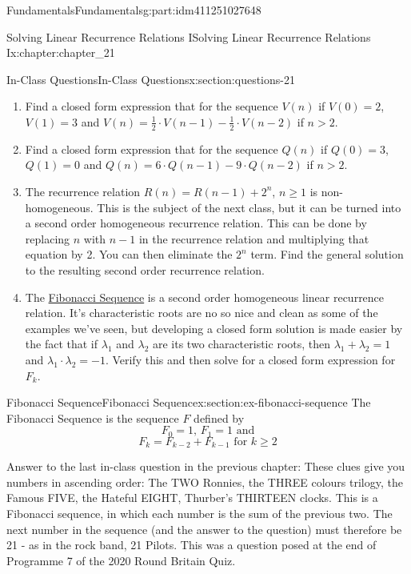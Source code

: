 \documentclass[oneside,10pt,]{book}
\numberwithin{equation}{section}
\newcommand{\gt}{>}
\begin{document}
\begin{partptx}{Fundamentals}{}{Fundamentals}{}{}{g:part:idm411251027648}
\begin{chapterptx}{Solving Linear Recurrence Relations I}{}{Solving Linear Recurrence Relations I}{}{}{x:chapter:chapter_21}
\begin{sectionptx}{In-Class Questions}{}{In-Class Questions}{}{}{x:section:questions-21}
\begin{enumerate}[label=\arabic*.]
\item{}Find a closed form expression that for the sequence \(V(n)\) if  \(V(0)=2\), \(V(1)= 3\) and \(V(n)= \frac{1}{2}\cdot V(n-1)- \frac{1}{2}\cdot V(n-2)\) if \(n \gt 2\).%
\item{}Find a closed form expression that for the sequence \(Q(n)\) if  \(Q(0)=3\), \(Q(1)= 0\) and \(Q(n)=6\cdot Q(n-1)-9\cdot Q(n-2)\) if \(n \gt 2\).%
\item{}The recurrence relation \(R(n)=R(n-1)+2^n\), \(n \geq 1\) is non-homogeneous.  This is the subject of the next class, but it can be turned into a second order homogeneous recurrence relation.  This can be done by replacing \(n\) with \(n-1\) in the recurrence relation and multiplying that equation by 2.   You can then eliminate the \(2^n\) term. Find the general solution to the resulting second order recurrence relation.%
\item{}The \hyperref[x:section:ex-fibonacci-sequence]{Fibonacci Sequence}  is a second order homogeneous linear recurrence relation. It's characteristic roots are no so nice and clean as some of the examples we've seen, but developing a closed form solution is made easier by the fact that if \(\lambda_1\) and \(\lambda_2\) are its two characteristic roots, then \(\lambda_1 + \lambda_2 = 1\) and \(\lambda_1 \cdot \lambda_2 =-1\).  Verify this and then solve for a closed form expression for \(F_k\).%
\end{enumerate}
%
\end{sectionptx}
%
%
\typeout{************************************************}
\typeout{************************************************}
%
\begin{sectionptx}{Fibonacci Sequence}{}{Fibonacci Sequence}{}{}{x:section:ex-fibonacci-sequence}
%
The Fibonacci Sequence is the sequence \(F\) defined by%
\begin{equation*}
F_0= 1 \textrm{, } F_1= 1\textrm{ and}
\end{equation*}
%
\begin{equation*}
F_k = F_{k-2} + F_{k-1} \textrm{ for }k\geq 2
\end{equation*}
%
\par
Answer to the last in-class question in the previous chapter: These clues give you numbers in ascending order: The TWO Ronnies, the THREE colours trilogy, the Famous FIVE, the Hateful EIGHT, Thurber's THIRTEEN clocks. This is a Fibonacci sequence, in which each number is the sum of the previous two. The next number in the sequence (and the answer to the question) must therefore be 21 - as in the rock band, 21 Pilots. This was a question posed at the end of Programme 7 of the 2020 Round Britain Quiz.%

\end{sectionptx}
\end{chapterptx}
\end{partptx}
\end{document}
